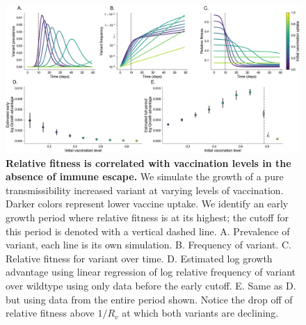 \documentclass[12pt,oneside,letterpaper]{article}
\begin{document}
\begin{figure}[h]
    \centering
    \includegraphics[width=0.8\linewidth]{./figures/correlation_not_mechanism.png}
    \caption{\textbf{Relative fitness is correlated with vaccination levels in the absence of immune escape.}
    We simulate the growth of a pure transmissibility increased variant at varying levels of vaccination.
    Darker colors represent lower vaccine uptake.
    We identify an early growth period where relative fitness is at its highest; the cutoff for this period is denoted with a vertical dashed line.
        A. Prevalence of variant, each line is its own simulation.
        B. Frequency of variant.
        C. Relative fitness for variant over time.
        D. Estimated log growth advantage using linear regression of log relative frequency of variant over wildtype using only data before the early cutoff.
        E. Same as D. but using data from the entire period shown. Notice the drop off of relative fitness above $1 / R_{v}$ at which both variants are declining.
    }
\label{fig:mechanism_identification}
\end{figure}





\end{document}
